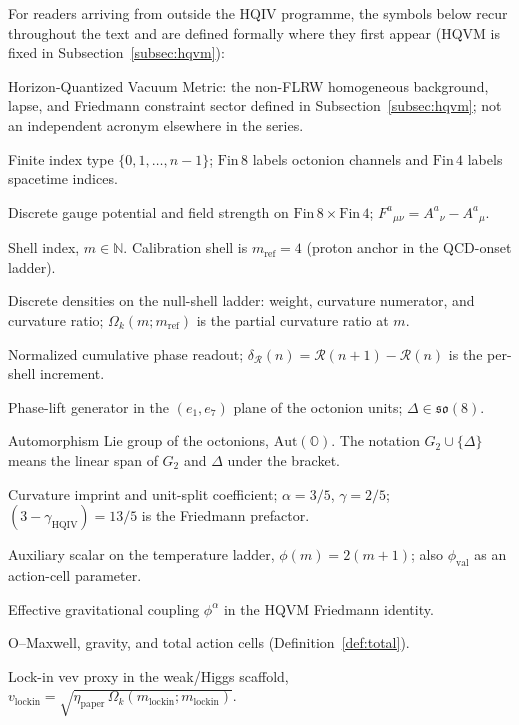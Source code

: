 \documentclass[11pt]{amsart}
\begin{document}
For readers arriving from outside the HQIV programme, the symbols below recur throughout the text and are defined formally where they first appear (HQVM is fixed in Subsection~\ref{subsec:hqvm}):
\begin{description}[
  font=\normalfont,
  leftmargin=0pt,
  labelwidth=0pt,
  itemsep=0.45\baselineskip,
  parsep=0.1\baselineskip,
  topsep=0.25\baselineskip,
  style=nextline
]
  \item[HQVM]
  Horizon-Quantized Vacuum Metric: the non-FLRW homogeneous background, lapse, and Friedmann constraint sector defined in Subsection~\ref{subsec:hqvm}; not an independent acronym elsewhere in the series.
  \item[\(\mathrm{Fin}\,n\)]
  Finite index type \(\{0,1,\dots,n-1\}\); \(\mathrm{Fin}\,8\) labels octonion channels and \(\mathrm{Fin}\,4\) labels spacetime indices.
  \item[\(A^a{}_\mu\), \(F^a{}_{\mu\nu}\)]
  Discrete gauge potential and field strength on \(\mathrm{Fin}\,8\times\mathrm{Fin}\,4\); \(F^a{}_{\mu\nu}=A^a{}_\nu-A^a{}_\mu\).
  \item[\(m\)]
  Shell index, \(m\in\mathbb{N}\). Calibration shell is \(m_{\mathrm{ref}}=4\) (proton anchor in the QCD-onset ladder).
  \item[\(\rho\), \(K\), \(\Omega\)]
  Discrete densities on the null-shell ladder: weight, curvature numerator, and curvature ratio; \(\Omega_k(m;m_{\mathrm{ref}})\) is the partial curvature ratio at \(m\).
  \item[\(\mathcal{R}\)]
  Normalized cumulative phase readout; \(\delta_{\mathcal{R}}(n)=\mathcal{R}(n+1)-\mathcal{R}(n)\) is the per-shell increment.
  \item[\(\Delta\)]
  Phase-lift generator in the \((e_1,e_7)\) plane of the octonion units; \(\Delta\in\mathfrak{so}(8)\).
  \item[\(G_2\)]
  Automorphism Lie group of the octonions, \(\mathrm{Aut}(\mathbb{O})\). The notation \(G_2\cup\{\Delta\}\) means the linear span of \(G_2\) and \(\Delta\) under the bracket.
  \item[\(\alpha\), \(\gamma_{\mathrm{HQIV}}\)]
  Curvature imprint and unit-split coefficient; \(\alpha=3/5\), \(\gamma=2/5\); \((3-\gamma_{\mathrm{HQIV}})=13/5\) is the Friedmann prefactor.
  \item[\(\phi(m)\)]
  Auxiliary scalar on the temperature ladder, \(\phi(m)=2(m+1)\); also \(\phi_{\mathrm{val}}\) as an action-cell parameter.
  \item[\(G_{\mathrm{eff}}(\phi)\)]
  Effective gravitational coupling \(\phi^{\alpha}\) in the HQVM Friedmann identity.
  \item[\(\mathcal{S}_O\), \(\mathcal{S}_{\mathrm{grav}}\), \(\mathcal{S}_{\mathrm{tot}}\)]
  O--Maxwell, gravity, and total action cells (Definition~\ref{def:total}).
  \item[\(v_{\mathrm{lockin}}\)]
  Lock-in vev proxy in the weak/Higgs scaffold,
  \(v_{\mathrm{lockin}}=\sqrt{\eta_{\mathrm{paper}}\,\Omega_k(m_{\mathrm{lockin}};m_{\mathrm{lockin}})}\).
\end{description}
\end{document}
